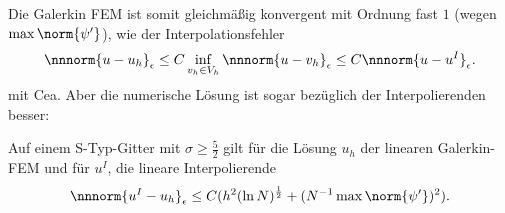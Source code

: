 Die Galerkin FEM ist somit gleichmäßig konvergent mit Ordnung fast $1$ (wegen $\max \norm {\psi'}$), wie der Interpolationsfehler
\begin{align*}
  \nnnorm {u - u_{h}}_{\epsilon} \leq C \inf_{v_{h} \in V_{h}} \nnnorm{u - v_{h}}_{\epsilon} \leq C \nnnorm{u - u^{I}}_{\epsilon}. 
\end{align*}
mit Cea. Aber die numerische Lösung ist sogar bezüglich der Interpolierenden besser: 
\begin{satz}\label{thm:6-16}
  Auf einem S-Typ-Gitter mit $\sigma \geq \frac 52$ gilt für die Lösung $u_{h}$ der linearen Galerkin-FEM und für $u^{I}$, die lineare Interpolierende
  \begin{align*}
    \nnnorm{u^{I} - u_{h}}_{\epsilon} \leq C (h^{2} (\ln N)^{\frac 12} + (N^{-1} \max \norm{\psi'}) ^{2}). 
  \end{align*}
\end{satz}
